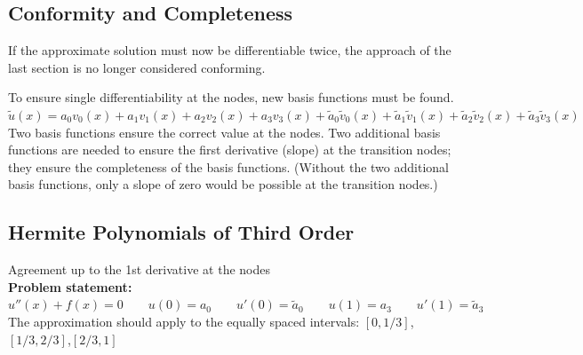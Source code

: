 \subsection{Conformity and Completeness}
If the approximate solution must now be differentiable twice,
the approach of the last section is no longer considered conforming.

To ensure single differentiability at the nodes, new basis functions must be found.\\

$\tilde{u}(x)=a_0v_0(x)+a_1v_1(x)+a_2v_2(x)+a_3v_3(x)+\tilde{a}_0\tilde{v}_0(x)+\tilde{a}_1\tilde{v}_1(x)+\tilde{a}_2\tilde{v}_2(x)+\tilde{a}_3\tilde{v}_3(x)$\\

Two basis functions ensure the correct value at the nodes.
Two additional basis functions are needed to ensure the first derivative (slope)
at the transition nodes; they ensure the completeness of the basis functions.
(Without the two additional basis functions, only a slope of zero would be possible at the transition nodes.)

\subsection{Hermite Polynomials of Third Order}
Agreement up to the 1st derivative at the nodes\\

\textbf{Problem statement:} $u''(x)+f(x)=0\qquad u(0)=a_0\qquad u'(0)=\tilde{a}_0 \qquad u(1)=a_3\qquad  u'(1)=\tilde{a}_3$\\

The approximation should apply to the equally spaced intervals: $[0,1/3]$,\quad $[1/3,2/3]$,\quad $[2/3,1]$\\

